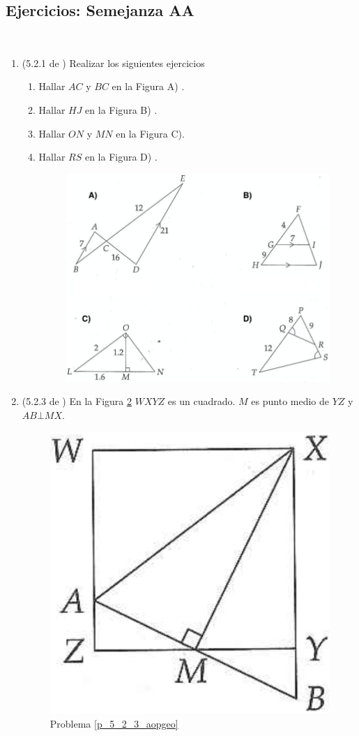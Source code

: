 \newpage
\begin{center}
	\vspace{-1cm}
	\section{ Ejercicios: Semejanza AA}
\end{center}

\begin{exer}{\ \\}	
\begin{enumerate}
	\item (5.2.1 de \cite{Aops_Geometria}) Realizar los siguientes ejercicios 
	\begin{enumerate}[label=\Alph*)]
		 \item Hallar $AC$ y $BC$ en la Figura A) .
		
		\item  Hallar $HJ$ en la Figura B) .
		
		\item  Hallar $ON$ y $MN$ en la Figura C).
		
		\item Hallar $RS$ en la Figura D) .
		
			\begin{figure}[H]
				\centering
				\includegraphics[width=0.7\linewidth]{Geometria/imgs/aops_geo_5_2_1}
				\label{aops_geo_5_2_1}
			\end{figure}
	\end{enumerate}
	
	\item \label{p_5_2_3_aopgeo}(5.2.3 de \cite{Aops_Geometria}) En la Figura \ref{aops_geo_5_2_3} $WXYZ$ es un cuadrado. $M$ es punto medio de $YZ$ y $AB\bot MX$.
		\begin{figure}[H]
			\centering
			\includegraphics[width=0.3\linewidth]{Geometria/imgs/aops_geo_5_2_3}
			\caption{Problema \ref{p_5_2_3_aopgeo} }
			\label{aops_geo_5_2_3}
		\end{figure}


\end{enumerate}
\end{exer}
